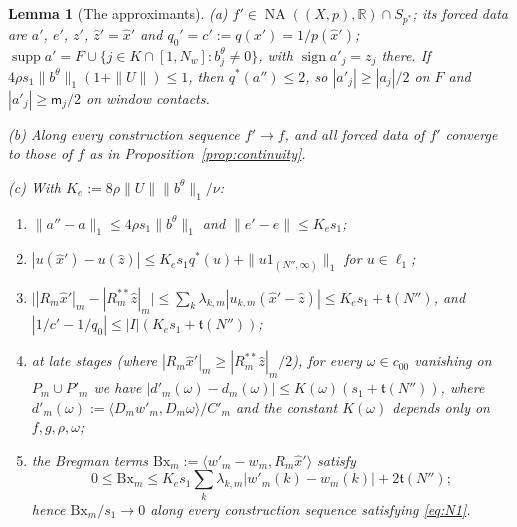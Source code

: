 \documentclass[10pt]{amsart}
\newtheorem{lemma}[theorem]{Lemma}
\theoremstyle{definition}
\theoremstyle{remark}
\newcommand{\NA}{\operatorname{NA}}
\newcommand{\supp}{\operatorname{supp}}
\newcommand{\sgn}{\operatorname{sign}}
\newcommand{\R}{\mathbb R}
\newcommand{\zh}{\hat z}
\newcommand{\ip}[2]{\langle #1,#2\rangle}
\begin{document}
\begin{lemma}[The approximants]\label{lem:approxfacts}
\textup{(a)} $f'\in\NA((X,p),\R)\cap S_{p^*}$; its forced data are $a'$,
$e'$, $z'$, $\zh'=\hat x'$ and $q_0'=c':=q(x')=1/p(\hat x')$;
$\supp a'=F\cup\{j\in K\cap[1,N_w]:b^\theta_j\ne0\}$, with $\sgn a'_j=z_j$
there.  If $4\rho s_1\|b^\theta\|_1(1+\|U\|)\le1$, then $q^*(a'')\le2$, so
$|a'_j|\ge|a_j|/2$ on $F$ and $|a'_j|\ge \mathsf m_j/2$ on window contacts.

\textup{(b)} Along every construction sequence $f'\to f$, and all forced data
of $f'$ converge to those of $f$ as in Proposition~\ref{prop:continuity}.

\textup{(c)} With $K_e:=8\rho\|U\|\|b^\theta\|_1/\nu$:
\begin{enumerate}
\item[(E1)] $\|a''-a\|_1\le4\rho s_1\|b^\theta\|_1$ and $\|e'-e\|\le K_es_1$;
\item[(E2)] $|u(\hat x')-u(\zh)|\le K_es_1q^*(u)+\|u1_{(N'',\infty)}\|_1$ for
$u\in\ell_1$;
\item[(E3)] $\big||R_m\hat x'|_m-|R_m^{**}\zh|_m\big|\le\sum_k\lambda_{k,m}
|u_{k,m}(\hat x'-\zh)|\le K_es_1+\mathfrak t(N'')$, and
$|1/c'-1/q_0|\le|I|(K_es_1+\mathfrak t(N''))$;
\item[(E4)] at late stages \textup{(}where $|R_m\hat x'|_m\ge
|R^{**}_m\zh|_m/2$\textup{)}, for every $\omega\in c_{00}$ vanishing on
$P_m\cup P'_m$ we have $|d'_m(\omega)-d_m(\omega)|\le K(\omega)(s_1+\mathfrak t(N''))$, where
$d'_m(\omega):=\ip{D_mw'_m}{D_m\omega}/C'_m$ and the constant $K(\omega)$
depends only on $f,g,\rho,\omega$;
\item[(E5)] the \emph{Bregman terms} $\mathrm{Bx}_m:=\ip{w'_m-w_m}{R_m\hat x'}$
satisfy
\[
 0\le\mathrm{Bx}_m\le K_es_1\sum_k\lambda_{k,m}|w'_m(k)-w_m(k)|+2\mathfrak t(N'');
\]
hence $\mathrm{Bx}_m/s_1\to0$ along every construction
sequence satisfying \eqref{eq:N1}.
\end{enumerate}
\end{lemma}
\end{document}
